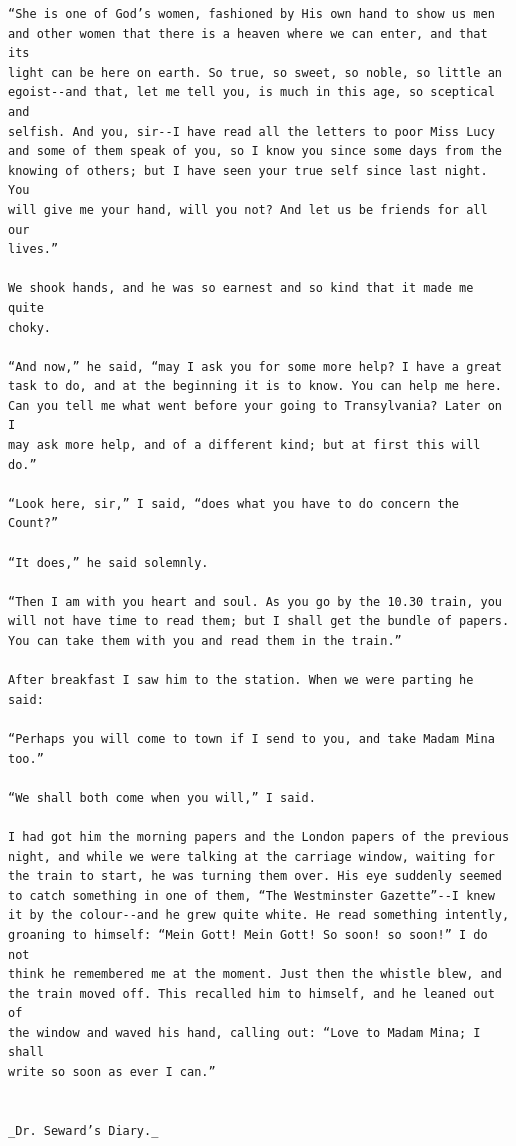 \documentclass{article}
\begin{document}
\begin{verbatim}
“She is one of God’s women, fashioned by His own hand to show us men
and other women that there is a heaven where we can enter, and that its
light can be here on earth. So true, so sweet, so noble, so little an
egoist--and that, let me tell you, is much in this age, so sceptical and
selfish. And you, sir--I have read all the letters to poor Miss Lucy
and some of them speak of you, so I know you since some days from the
knowing of others; but I have seen your true self since last night. You
will give me your hand, will you not? And let us be friends for all our
lives.”

We shook hands, and he was so earnest and so kind that it made me quite
choky.

“And now,” he said, “may I ask you for some more help? I have a great
task to do, and at the beginning it is to know. You can help me here.
Can you tell me what went before your going to Transylvania? Later on I
may ask more help, and of a different kind; but at first this will do.”

“Look here, sir,” I said, “does what you have to do concern the Count?”

“It does,” he said solemnly.

“Then I am with you heart and soul. As you go by the 10.30 train, you
will not have time to read them; but I shall get the bundle of papers.
You can take them with you and read them in the train.”

After breakfast I saw him to the station. When we were parting he said:

“Perhaps you will come to town if I send to you, and take Madam Mina
too.”

“We shall both come when you will,” I said.

I had got him the morning papers and the London papers of the previous
night, and while we were talking at the carriage window, waiting for
the train to start, he was turning them over. His eye suddenly seemed
to catch something in one of them, “The Westminster Gazette”--I knew
it by the colour--and he grew quite white. He read something intently,
groaning to himself: “Mein Gott! Mein Gott! So soon! so soon!” I do not
think he remembered me at the moment. Just then the whistle blew, and
the train moved off. This recalled him to himself, and he leaned out of
the window and waved his hand, calling out: “Love to Madam Mina; I shall
write so soon as ever I can.”


_Dr. Seward’s Diary._


\end{verbatim}
\end{document}

